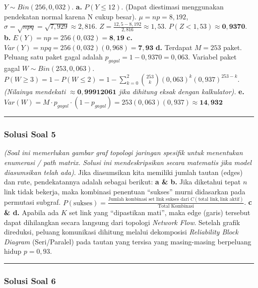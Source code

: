 \documentclass[
  letterpaper,
  DIV=11,
  numbers=noendperiod]{scrartcl}
\begin{document}
\(Y \sim Bin(256, 0,032)\). \textbf{a.} \(P(Y \le 12)\). (Dapat
diestimasi menggunakan pendekatan normal karena N cukup besar).
\(\mu = np = 8,192\),
\(\sigma = \sqrt{npq} = \sqrt{7,929} \approx 2,816\).
\(Z = \frac{12,5 - 8,192}{2,816} \approx 1,53\).
\(P(Z < 1,53) \approx \mathbf{0,9370}\). \textbf{b.}
\(E(Y) = np = 256(0,032) = \mathbf{8,19}\) \textbf{c.}
\(Var(Y) = npq = 256(0,032)(0,968) = \mathbf{7,93}\) \textbf{d.}
Terdapat \(M=253\) paket. Peluang satu paket gagal adalah
\(p_{gagal} = 1 - 0,9370 = 0,063\). Variabel paket gagal
\(W \sim Bin(253, 0,063)\).
\(P(W \ge 3) = 1 - P(W \le 2) = 1 - \sum_{k=0}^{2} \binom{253}{k}(0,063)^k(0,937)^{253-k}\).
\emph{(Nilainya mendekati \(\approx \mathbf{0,99912061}\) jika dihitung
eksak dengan kalkulator).} \textbf{e.}
\(Var(W) = M \cdot p_{gagal} \cdot (1 - p_{gagal}) = 253(0,063)(0,937) \approx \mathbf{14,932}\)

\begin{center}\rule{0.5\linewidth}{0.5pt}\end{center}

\subsubsection{\texorpdfstring{\textbf{Solusi Soal
5}}{Solusi Soal 5}}\label{solusi-soal-5}

\emph{(Soal ini memerlukan gambar graf topologi jaringan spesifik untuk
menentukan enumerasi / path matrix. Solusi ini mendeskripsikan secara
matematis jika model diasumsikan telah ada)}. Jika diasumsikan kita
memiliki jumlah tautan (edges) dan rute, pendekatannya adalah sebagai
berikut: \textbf{a \& b.} Jika diketahui tepat \(n\) link tidak bekerja,
maka kombinasi penentuan ``sukses'' murni didasarkan pada permutasi
subgraf.
\(P(\text{sukses}) = \frac{\text{Jumlah kombinasi set link sukses dari } C(\text{total link}, \text{link aktif})}{\text{Total Kombinasi}}\).
\textbf{c \& d.} Apabila ada \(K\) set link yang ``dipastikan mati'',
maka edge (garis) tersebut dapat dihilangkan secara langsung dari
topologi \emph{Network Flow}. Setelah grafik direduksi, peluang
komunikasi dihitung melalui dekomposisi \emph{Reliability Block Diagram}
(Seri/Paralel) pada tautan yang tersisa yang masing-masing berpeluang
hidup \(p=0,93\).

\begin{center}\rule{0.5\linewidth}{0.5pt}\end{center}

\subsubsection{\texorpdfstring{\textbf{Solusi Soal
6}}{Solusi Soal 6}}\label{solusi-soal-6}
\end{document}
